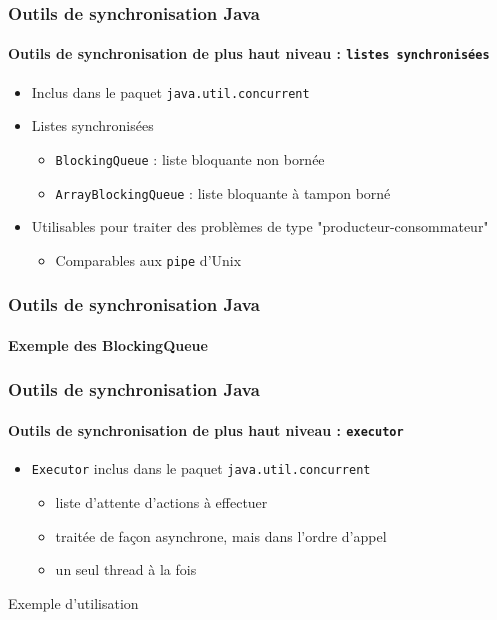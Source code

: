 \begin{frame}
\frametitle{Outils de synchronisation Java}
\framesubtitle{Outils de synchronisation de plus haut niveau : \texttt{listes synchronisées}}
\begin{itemize}
\item Inclus dans le paquet \texttt{java.util.concurrent}
\item Listes synchronisées
\begin{itemize}
\item \texttt{BlockingQueue} : liste bloquante non bornée
\item \texttt{ArrayBlockingQueue} : liste bloquante à tampon borné
\end{itemize}
\item Utilisables pour traiter des problèmes de type "producteur-consommateur"
\begin{itemize}
\item Comparables aux \texttt{pipe} d'Unix
\end{itemize}
\end{itemize}
\end{frame}

\begin{frame}
\frametitle{Outils de synchronisation Java}
\framesubtitle{Exemple des BlockingQueue}

\end{frame}

\begin{frame}
\frametitle{Outils de synchronisation Java}
\framesubtitle{Outils de synchronisation de plus haut niveau : \texttt{executor}}
\begin{itemize}
\item \texttt{Executor} inclus dans le paquet \texttt{java.util.concurrent}
\begin{itemize}
\item liste d'attente d'actions à effectuer
\item traitée de façon asynchrone, mais dans l'ordre d'appel
\item un seul thread à la fois
\end{itemize}
\end{itemize}
\begin{exampleblock}{Exemple d'utilisation}
\begin{scriptsize}

\end{scriptsize}
\end{exampleblock}
\end{frame}



